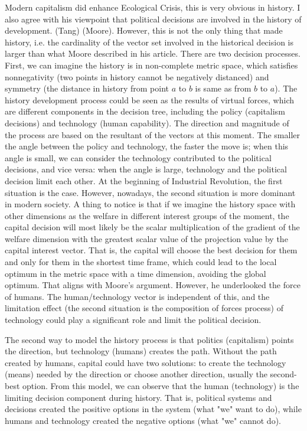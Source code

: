 \documentclass[12pt]{article}
\newcommand{\IR}{Industrial Revolution}
\newcommand{\EC}{Ecological Crisis}
\begin{document}
\begin{flushleft}
Modern capitalism did enhance \EC, this is very obvious in history. I also agree with his viewpoint that political decisions are involved in the history of development. (Tang) (Moore). However, this is not the only thing that made history, i.e. the cardinality of the vector set involved in the historical decision is larger than what Moore described in his article. There are two decision processes. First, we can imagine the history is in non-complete metric space, which satisfies nonnegativity (two points in history cannot be negatively distanced) and symmetry (the distance in history from point $a$ to $b$ is same as from $b$ to $a$).
The history development process could be seen as the results of virtual forces, which are different components in the decision tree, including the policy (capitalism decisions) and technology (human capability). The direction and magnitude of the process are based on the resultant of the vectors at this moment. The smaller the angle between the policy and technology, the faster the move is; when this angle is small, we can consider the technology contributed to the political decisions, and vice versa: when the angle is large, technology and the political decision limit each other.  At the beginning of \IR, the first situation is the case. However, nowadays, the second situation is more dominant in modern society. A thing to notice is that if we imagine the history space with other dimensions as the welfare in different interest groups of the moment, the capital decision will most likely be the scalar multiplication of the gradient of the welfare dimension with the greatest scalar value of the projection value by the capital interest vector. That is, the capital will choose the best decision for them and only for them in the shortest time frame, which could lead to the local optimum in the metric space with a time dimension, avoiding the global optimum.  
That aligns with Moore's argument. However, he underlooked the force of humans.
The human/technology vector is independent of this, and the limitation effect (the second situation is the composition of forces process) of technology could play a significant role and limit the political decision. 

The second way to model the history process is that politics (capitalism) points the direction, but technology (humans) creates the path. Without the path created by humans, capital could have two solutions: to create the technology (means) needed by the direction or choose another direction, usually the second-best option. From this model, we can observe that the human (technology) is the limiting decision component during history. That is, political systems and decisions created the positive options in the system (what "we" want to do), while humans and technology created the negative options (what "we" cannot do).


\end{flushleft}
\end{document}
